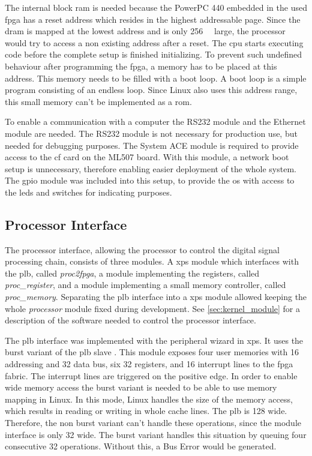 \documentclass[12pt,a4paper,parskip=full,abstract=true,BCOR=12mm,twoside,open=right]{scrreprt}
\def\device#1{\textit{#1}}
\begin{document}
The internal block \gls{ram} is needed because the PowerPC 440 embedded
in the used \gls{fpga} has a reset address which resides in the highest
addressable page\cite{ppc}. Since the \gls{dram} is mapped at the lowest address
and is only \SI{256}{\mebi\byte} large\cite{ml507}, the processor would try to access
a non existing address after a reset. The \gls{cpu} starts
executing code before the complete setup is finished initializing. To prevent such undefined
behaviour after programming the \gls{fpga}, a memory has to be placed at
this address. This memory needs to be filled with a boot loop. A boot
loop is a simple program consisting of an endless loop. Since Linux
also uses this address range, this small memory can't be implemented
as a \gls{rom}.

To enable a communication with a computer the RS232 module and the Ethernet
module are needed. The RS232 module is not necessary for production use,
but needed for debugging purposes. The System ACE module is required to
provide access to the \gls{cf} card on the ML507 board. With this module,
a network boot setup is unnecessary, therefore enabling easier deployment
of the whole system. The \gls{gpio} module was included into this setup,
to provide the \gls{os} with access to the \glspl{led} and switches for
indicating purposes.


\subsection{Processor Interface}
\label{sec:processor_interface}

The processor interface, allowing the processor to control the digital
signal processing chain, consists of three modules. A \gls{xps} module which
interfaces with the \gls{plb}, called \device{proc2fpga}, a module
implementing the registers, called \device{proc\_register}, and a module
implementing a small memory controller, called \device{proc\_memory}. Separating
the \gls{plb} interface into a \gls{xps} module allowed keeping the whole
\device{processor} module fixed during development. See \cref{sec:kernel_module}
for a description of the software needed to control the processor interface.

The \gls{plb} interface was implemented with the peripheral wizard in \gls{xps}.
It uses the burst variant of the \gls{plb} slave \cite{slave_burst}. This module
exposes four user memories with \SI{16}{\bit} addressing and \SI{32}{\bit} data
bus, six \SI{32}{\bit} registers, and 16 interrupt lines to the \gls{fpga} fabric.
The interrupt lines are triggered on the positive edge. In order to enable wide
memory access the burst variant is needed to be able to use memory mapping in
Linux. In this mode, Linux handles the
size of the memory access, which results in reading or writing in whole
cache lines. The \gls{plb} is \SI{128}{\bit} wide. Therefore, the non burst variant
can't handle these operations, since the module interface is only \SI{32}{\bit}
wide. The burst variant handles this situation by queuing four consecutive
\SI{32}{\bit} operations. Without this, a Bus Error would be generated.
\end{document}

